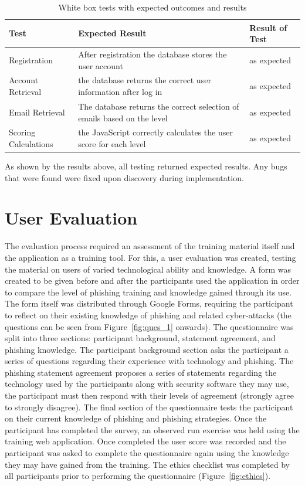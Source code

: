 \documentclass{l4proj}
\begin{document}
\begin{table}[H]
\begin{tabular}{ | m{10em} | m{20em}| m{10em} | } 
  \hline
  \textbf{Test} & \textbf{Expected Result} & \textbf{Result of Test} \\ 
  \hline
  Registration & After registration the database stores the user account & as expected \\ 
  \hline
  Account Retrieval & the database returns the correct user information after log in & as expected \\ 
  \hline
  Email Retrieval & The database returns the correct selection of emails based on the level & as expected \\ 
  \hline
  Scoring Calculations & the JavaScript correctly calculates the user score for each level & as expected \\ 
  \hline
\end{tabular}
\caption{White box tests with expected outcomes and results}
\label{table:white_box}
\end{table}

As shown by the results above, all testing returned expected results. Any bugs that were found were fixed upon discovery during implementation.

\section{User Evaluation}
The evaluation process required an assessment of the training material itself and the application as a training tool. For this, a user evaluation was created, testing the material on users of varied technological ability and knowledge. A form was created to be given before and after the participants used the application in order to compare the level of phishing training and knowledge gained through its use. The form itself was distributed through Google Forms, requiring the participant to reflect on their existing knowledge of phishing and related cyber-attacks (the questions can be seen from Figure~\ref{fig:ques_1} onwards). The questionnaire was split into three sections: participant background, statement agreement, and phishing knowledge. The participant background section asks the participant a series of questions regarding their experience with technology and phishing. The phishing statement agreement proposes a series of statements regarding the technology used by the participants along with security software they may use, the participant must then respond with their levels of agreement (strongly agree to strongly disagree). The final section of the questionnaire tests the participant on their current knowledge of phishing and phishing strategies. Once the participant has completed the survey, an observed run exercise was held using the training web application. Once completed the user score was recorded and the participant was asked to complete the questionnaire again using the knowledge they may have gained from the training. The ethics checklist was completed by all participants prior to performing the questionnaire (Figure~\ref{fig:ethics}).
\end{document}
